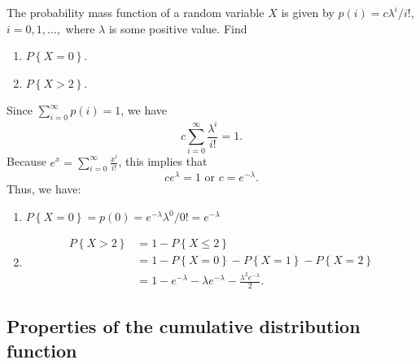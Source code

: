 \begin{changebar}
    \begin{example}
        The probability mass function of a random variable $X$ is given by $p(i) = c\lambda^i/i!$, $i = 0, 1, \dots,$ where $\lambda$ is some positive value. Find \begin{enumerate}[label=(\alph*)]
            \item $P\left\{ X = 0 \right\}$.
            \item $P\left\{ X > 2 \right\}$.
        \end{enumerate}
    \end{example}
    \begin{solution}
        Since $\displaystyle \sum^\infty_{i = 0} p(i) = 1$, we have \[
            c \sum^\infty_{i = 0} \frac{\lambda^i}{i!} = 1.    
        \] Because $\displaystyle e^x = \sum^\infty_{i = 0} \frac{x^i}{i!}$, this implies that \[
            ce^\lambda = 1 \text{ or } c = e^{-\lambda}.    
        \]
        Thus, we have: \begin{enumerate}[label=(\alph*)]
            \item $P\left\{ X = 0 \right\} = p(0) = e^{-\lambda}\lambda^0/0! = e^{-\lambda}$
            \item \[
                \begin{aligned}
                    P\left\{ X > 2 \right\} &= 1 - P\left\{ X \leq 2 \right\} \\
                    &= 1 - P\left\{ X = 0 \right\} - P\left\{ X = 1 \right\} - P\left\{ X = 2 \right\} \\
                    &= 1 - e^{-\lambda} - \lambda e^{-\lambda} - \frac{\lambda^2e^{-\lambda}}{2}.
                \end{aligned}    
            \]
        \end{enumerate}
    \end{solution}
\end{changebar}

\pagebreak
\subsection{Properties of the cumulative distribution function}\label{cumdistproperties}